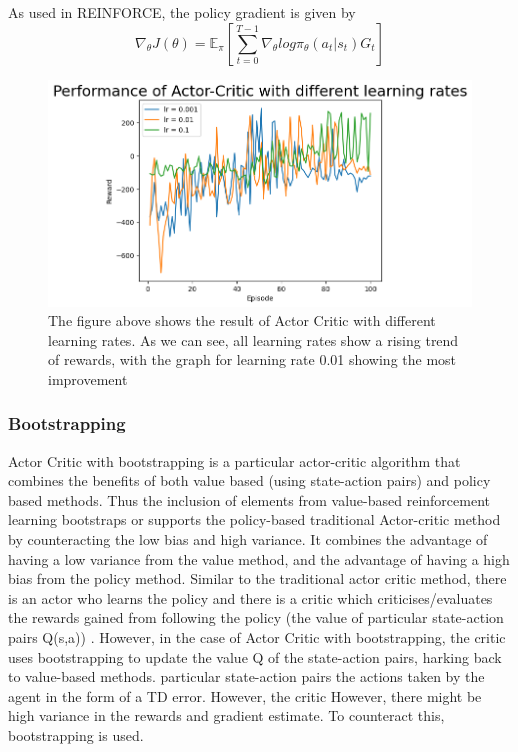 \documentclass{article}
\begin{document}
\newline As used in REINFORCE, the policy gradient is given by 
\newline 
\begin{equation*}
\nabla_\theta J(\theta) = \mathbb{E}_\pi[\sum _{t=0}^{T-1} \nabla_\theta log\pi_\theta (a_t|s_t)G_t]
\end{equation*}
\begin{figure}[htbp]
\centering
\includegraphics[width=1.0\linewidth]{Report/images/actor_critic_no_bs.png}
\caption{\label{fig:ActorCritic}The figure above shows the result of Actor Critic with different learning rates. As we can see, all learning rates show a rising trend of rewards, with the graph for learning rate 0.01 showing the most improvement}
\end{figure}



\subsubsection{Bootstrapping}
Actor Critic with bootstrapping is a particular actor-critic algorithm that combines the benefits of both value based (using state-action pairs) and policy based methods. Thus the inclusion of elements from value-based reinforcement learning bootstraps or supports the policy-based traditional Actor-critic method by counteracting the low bias and high variance. It combines the advantage of having a low variance from the value method, and the advantage of having a high bias from the policy method.
Similar to the traditional actor critic method, there is an actor who learns the policy and there is a critic which criticises/evaluates the rewards gained from following the policy (the value of particular state-action pairs Q(s,a)) . However, in the case of Actor Critic with bootstrapping, the critic uses bootstrapping to update the value Q of the state-action pairs, harking back to value-based methods. \newline 
particular state-action pairs  the actions taken by the agent in the form of a TD error. However, the critic 
However, there might be high variance in the rewards and gradient estimate. To counteract this, bootstrapping is used. 
\end{document}
